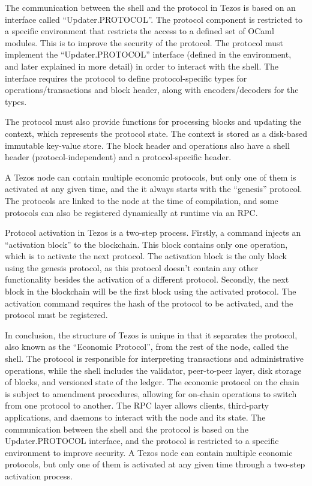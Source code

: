 The communication between the shell and the protocol in Tezos is based on an interface called ``Updater.PROTOCOL''.
The protocol component is restricted to a specific environment that restricts the access to a defined set of OCaml modules. This is to improve the security of the protocol.
The protocol must implement the ``Updater.PROTOCOL'' interface (defined in the environment, and later explained in more detail) in order to interact with the shell. The interface requires the protocol to define protocol-specific types for operations/transactions and block header, along with encoders/decoders for the types.

The protocol must also provide functions for processing blocks and updating the context, which represents the protocol state. The context is stored as a disk-based immutable key-value store. The block header and operations also have a shell header (protocol-independent) and a protocol-specific header.

A Tezos node can contain multiple economic protocols, but only one of them is activated at any given time, and the it always starts with the ``genesis'' protocol.
The protocols are linked to the node at the time of compilation, and some protocols can also be registered dynamically at runtime via an RPC.

Protocol activation in Tezos is a two-step process. Firstly, a command injects an ``activation block'' to the blockchain. This block contains only one operation, which is to activate the next protocol. The activation block is the only block using the genesis protocol, as this protocol doesn't contain any other functionality besides the activation of a different protocol.
Secondly, the next block in the blockchain will be the first block using the activated protocol. The activation command requires the hash of the protocol to be activated, and the protocol must be registered.

In conclusion, the structure of Tezos is unique in that it separates the protocol, also known as the ``Economic Protocol'', from the rest of the node, called the shell. The protocol is responsible for interpreting transactions and administrative operations, while the shell includes the validator, peer-to-peer layer, disk storage of blocks, and versioned state of the ledger. The economic protocol on the chain is subject to amendment procedures, allowing for on-chain operations to switch from one protocol to another. The RPC layer allows clients, third-party applications, and daemons to interact with the node and its state. The communication between the shell and the protocol is based on the Updater.PROTOCOL interface, and the protocol is restricted to a specific environment to improve security. A Tezos node can contain multiple economic protocols, but only one of them is activated at any given time through a two-step activation process.


